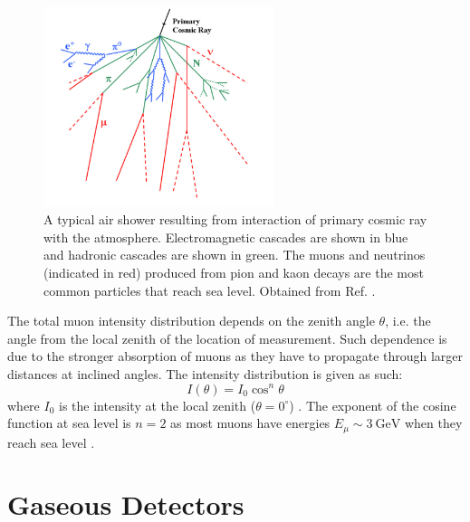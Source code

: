 \documentclass[a4paper]{report}
\numberwithin{equation}{section}
\begin{document}
\begin{figure}[htb!]
	\centering
	\includegraphics[width=0.6\textwidth]{air_shower.png}
	\caption{A typical air shower resulting from interaction of primary cosmic ray with the atmosphere. Electromagnetic cascades are shown in blue and hadronic 
	cascades are shown in green. The muons and neutrinos (indicated in red) produced from pion and kaon decays are the most common particles that reach sea level.
	Obtained from Ref. \cite{Blanco2009}.}
	\label{fig:air_shower}	
\end{figure}

The total muon intensity distribution depends on the zenith angle $\theta$, i.e. the angle from the local zenith of the location of 
measurement. Such dependence is due to the stronger absorption of muons as they have to propagate through larger distances at 
inclined angles. The intensity distribution is given as such: 
\begin{equation}
    I(\theta) = I_0 \cos^n \theta 
	\label{eq:muon_intensity}
\end{equation}
where $I_0$ is the intensity at the local zenith ($\theta = 0^\circ$) \cite{Grupen2005}. The exponent of the cosine function at 
sea level is $n = 2$ as most muons have energies $E_\mu \sim \SI{3}{\giga\electronvolt}$ when they reach sea level \cite{Stefano2012}.

\section{Gaseous Detectors} \label{section:gas}
\end{document}
